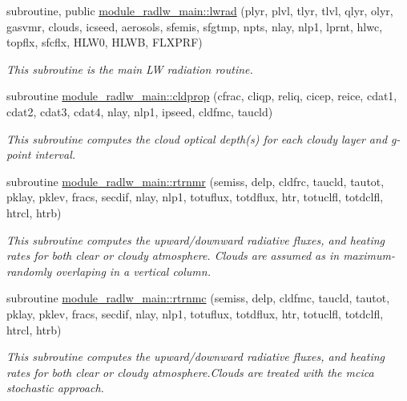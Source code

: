 \begin{DoxyCompactItemize}
\item 
subroutine, public \hyperlink{group__module__radlw__main_gaf20db29eaadab298ccd8b6bf489a53f4}{module\+\_\+radlw\+\_\+main\+::lwrad} (plyr, plvl, tlyr, tlvl, qlyr, olyr, gasvmr, clouds, icseed, aerosols, sfemis, sfgtmp, npts, nlay, nlp1, lprnt, hlwc, topflx, sfcflx, H\+L\+W0, H\+L\+WB, F\+L\+X\+P\+RF)
\begin{DoxyCompactList}\small\item\em This subroutine is the main LW radiation routine. \end{DoxyCompactList}\end{DoxyCompactItemize}
\begin{DoxyCompactItemize}
\item 
subroutine \hyperlink{group__module__radlw__main_ga6bfdea656cc7e1f773ffcc797e072e91}{module\+\_\+radlw\+\_\+main\+::cldprop} (cfrac, cliqp, reliq, cicep, reice, cdat1, cdat2, cdat3, cdat4, nlay, nlp1, ipseed, cldfmc, taucld)
\begin{DoxyCompactList}\small\item\em This subroutine computes the cloud optical depth(s) for each cloudy layer and g-\/point interval. \end{DoxyCompactList}\end{DoxyCompactItemize}
\begin{DoxyCompactItemize}
\item 
subroutine \hyperlink{group__module__radlw__main_ga8d4a6fecb4ad25468e91661a79d4ca20}{module\+\_\+radlw\+\_\+main\+::rtrnmr} (semiss, delp, cldfrc, taucld, tautot, pklay, pklev, fracs, secdif, nlay, nlp1, totuflux, totdflux, htr, totuclfl, totdclfl, htrcl, htrb)
\begin{DoxyCompactList}\small\item\em This subroutine computes the upward/downward radiative fluxes, and heating rates for both clear or cloudy atmosphere. Clouds are assumed as in maximum-\/randomly overlaping in a vertical column. \end{DoxyCompactList}\end{DoxyCompactItemize}
\begin{DoxyCompactItemize}
\item 
subroutine \hyperlink{group__module__radlw__main_ga1445abd529b76abe7ffb80e843d9fafc}{module\+\_\+radlw\+\_\+main\+::rtrnmc} (semiss, delp, cldfmc, taucld, tautot, pklay, pklev, fracs, secdif, nlay, nlp1, totuflux, totdflux, htr, totuclfl, totdclfl, htrcl, htrb)
\begin{DoxyCompactList}\small\item\em This subroutine computes the upward/downward radiative fluxes, and heating rates for both clear or cloudy atmosphere.\+Clouds are treated with the mcica stochastic approach. \end{DoxyCompactList}\end{DoxyCompactItemize}


